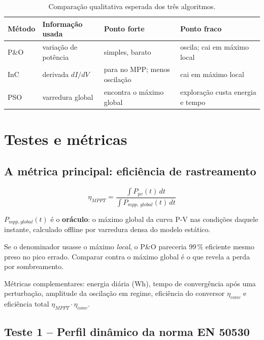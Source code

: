 \documentclass[11pt,a4paper]{article}
\begin{document}
\begin{table}[h]
\centering\small
\begin{tabular}{llll}
\toprule
Método & Informação usada & Ponto forte & Ponto fraco \\
\midrule
P\&O & variação de potência & simples, barato & oscila; cai em máximo local \\
InC & derivada $dI/dV$ & para no MPP; menos oscilação & cai em máximo local \\
PSO & varredura global & encontra o máximo global & exploração custa energia e tempo \\
\bottomrule
\end{tabular}
\caption{Comparação qualitativa esperada dos três algoritmos.}
\end{table}

\section{Testes e métricas}

\subsection{A métrica principal: eficiência de rastreamento}

\begin{equation}
\eta_{MPPT} = \frac{\displaystyle\int P_{pv}(t)\,dt}{\displaystyle\int P_{mpp,\,global}(t)\,dt}
\end{equation}

$P_{mpp,global}(t)$ é o \textbf{oráculo}: o máximo global da curva P-V nas condições daquele
instante, calculado offline por varredura densa do modelo estático.

\begin{atencao}
Se o denominador usasse o máximo \emph{local}, o P\&O pareceria 99\,\% eficiente mesmo
preso no pico errado. Comparar contra o máximo global é o que revela a perda por sombreamento.
\end{atencao}

Métricas complementares: energia diária (Wh), tempo de convergência após uma perturbação,
amplitude da oscilação em regime, eficiência do conversor $\eta_{conv}$ e eficiência total
$\eta_{MPPT}\cdot\eta_{conv}$.

\subsection{Teste 1 -- Perfil dinâmico da norma EN 50530}
\end{document}
